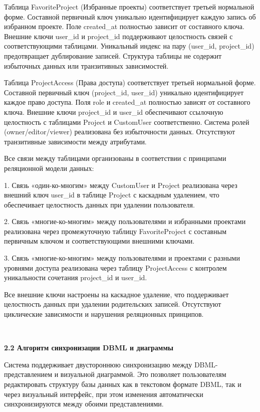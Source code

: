 Таблица FavoriteProject (Избранные проекты) соответствует третьей нормальной форме. Составной первичный ключ уникально идентифицирует каждую запись об избранном проекте. Поле created\_at полностью зависит от составного ключа. Внешние ключи user\_id и project\_id поддерживают целостность связей с соответствующими таблицами. Уникальный индекс на пару (user\_id, project\_id) предотвращает дублирование записей. Структура таблицы не содержит избыточных данных или транзитивных зависимостей.

Таблица ProjectAccess (Права доступа) соответствует третьей нормальной форме. Составной первичный ключ (project\_id, user\_id) уникально идентифицирует каждое право доступа. Поля role и created\_at полностью зависят от составного ключа. Внешние ключи project\_id и user\_id обеспечивают ссылочную целостность с таблицами Project и CustomUser соответственно. Система ролей (owner/editor/viewer) реализована без избыточности данных. Отсутствуют транзитивные зависимости между атрибутами.

Все связи между таблицами организованы в соответствии с принципами реляционной модели данных:

1. Связь «один-ко-многим» между CustomUser и Project реализована через внешний ключ user\_id в таблице Project с каскадным удалением, что обеспечивает целостность данных при удалении пользователя.

2. Связь «многие-ко-многим» между пользователями и избранными проектами реализована через промежуточную таблицу FavoriteProject с составным первичным ключом и соответствующими внешними ключами.

3. Связь «многие-ко-многим» между пользователями и проектами с разными уровнями доступа реализована через таблицу ProjectAccess с контролем уникальности сочетания project\_id и user\_id.

Все внешние ключи настроены на каскадное удаление, что поддерживает целостность данных при удалении родительских записей. Отсутствуют циклические зависимости и нарушения реляционных принципов.

\

\textbf{\large 2.2 Алгоритм синхронизации DBML и диаграммы}

Система поддерживает двустороннюю синхронизацию между DBML-представлением и визуальной диаграммой. Это позволяет пользователям редактировать структуру базы данных как в текстовом формате DBML, так и через визуальный интерфейс, при этом изменения автоматически синхронизируются между обоими представлениями.

